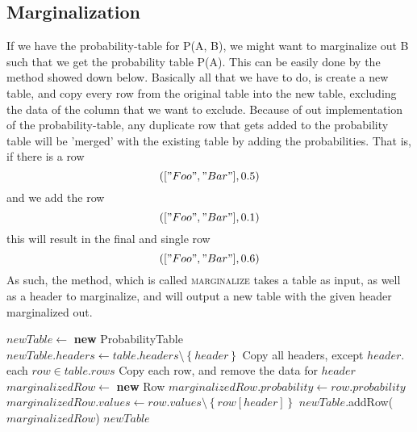 \documentclass[10pt,a4paper]{article}
\begin{document}
\subsection{Marginalization}
If we have the probability-table for P(A, B), we might want to marginalize out B such that we get the probability table P(A). This can be easily done by the method showed down below. Basically all that we have to do, is create a new table, and copy every row from the original table into the new table, excluding the data of the column that we want to exclude. Because of out implementation of the probability-table, any duplicate row that gets added to the probability table will be 'merged' with the existing table by adding the probabilities. That is, if there is a row $$(["Foo", "Bar"], 0.5)$$ and we add the row $$(["Foo", "Bar"], 0.1)$$ this will result in the final and single row $$(["Foo", "Bar"], 0.6)$$ As such, the method, which is called \textsc{marginalize} takes a table as input, as well as a header to marginalize, and will output a new table with the given header marginalized out.
\begin{codebox}
\li $newTable \gets $ \textbf{new} ProbabilityTable
\li $newTable.headers \gets table.headers \setminus \left\{ header \right\}$ \Comment Copy all headers, except $header$.
\zi
\li \For each $row \in table.rows$ \Comment Copy each row, and remove the data for $header$ \Do
\li     $marginalizedRow \gets $ \textbf{new} Row
\li     $marginalizedRow.probability \gets row.probability$
\li     $marginalizedRow.values \gets row.values \setminus \left\{ row[header] \right\}$
\li     $newTable$.{\sc addRow}($marginalizedRow$)
    \End
\zi
\li \Return $newTable$
\end{codebox}
\end{document}
